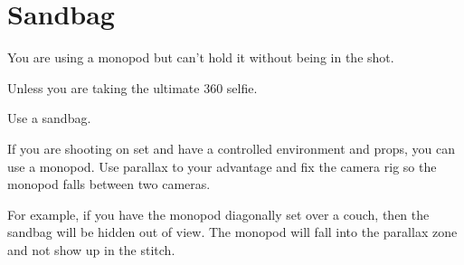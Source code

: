 \chapter{Sandbag}
\pagecolor{white}
\label{chap:12}
\begin{fullwidth}


\problem

{\large You are using a monopod but can’t hold it without being in the shot. \par}

Unless you are taking the ultimate 360 selfie. 

\solution

{\large Use a sandbag.  
 \par}

If you are shooting on set and have a controlled environment and props, you can use a monopod. Use parallax to your advantage and fix the camera rig so the monopod falls between two cameras. 

For example, if you have the monopod diagonally set over a couch, then the sandbag will be hidden out of view. The monopod will fall into the parallax zone and not show up in the stitch. 



\clearpage
\end{fullwidth}
